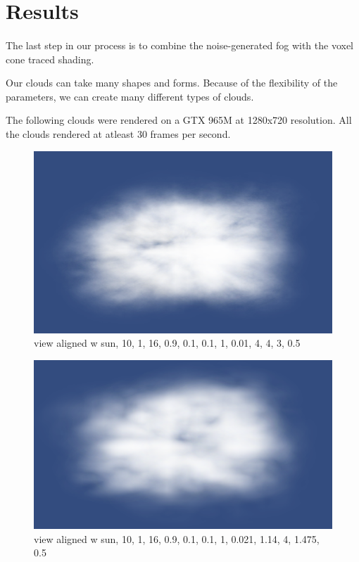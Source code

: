 \newpage
\section{Results}\paragraph{}
The last step in our process is to combine the noise-generated fog with the voxel cone traced shading.

Our clouds can take many shapes and forms. Because of the flexibility of the parameters, we can create many different types of clouds.

The following clouds were rendered on a GTX 965M at 1280x720 resolution. All the clouds rendered at atleast 30 frames per second.

\begin{figure}[h]
\centering
\includegraphics[width=\textwidth]{../res/res1.png}
\caption{view aligned w sun, 10, 1, 16, 0.9, 0.1, 0.1, 1, 0.01, 4, 4, 3, 0.5}
\end{figure}

\begin{figure}[h]
\centering
\includegraphics[width=\textwidth]{../res/res2.png}
\caption{view aligned w sun, 10, 1, 16, 0.9, 0.1, 0.1, 1, 0.021, 1.14, 4, 1.475, 0.5}
\end{figure}

